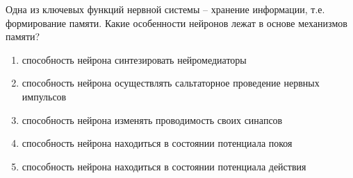 
Одна из ключевых функций нервной системы – хранение информации, т.е. формирование памяти. Какие особенности нейронов лежат в основе механизмов памяти?

\begin{enumerate}
    \item способность нейрона синтезировать нейромедиаторы
    \item способность нейрона осуществлять сальтаторное проведение нервных импульсов
    \item способность нейрона изменять проводимость своих синапсов
    \item способность нейрона находиться в состоянии потенциала покоя
    \item способность нейрона находиться в состоянии потенциала действия
\end{enumerate}